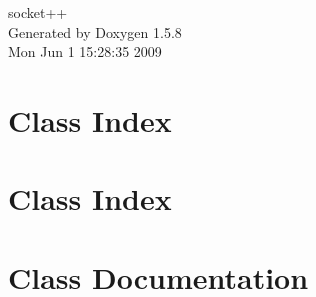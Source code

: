\documentclass[a4paper]{book}
\begin{document}
\begin{titlepage}
\vspace*{7cm}
\begin{center}
{\Large socket++ }\\
\vspace*{1cm}
{\large Generated by Doxygen 1.5.8}\\
\vspace*{0.5cm}
{\small Mon Jun 1 15:28:35 2009}\\
\end{center}
\end{titlepage}
\clearemptydoublepage
{}
\tableofcontents
\clearemptydoublepage
{}
\chapter{Class Index}

\chapter{Class Index}

\chapter{Class Documentation}





















\printindex
\end{document}
